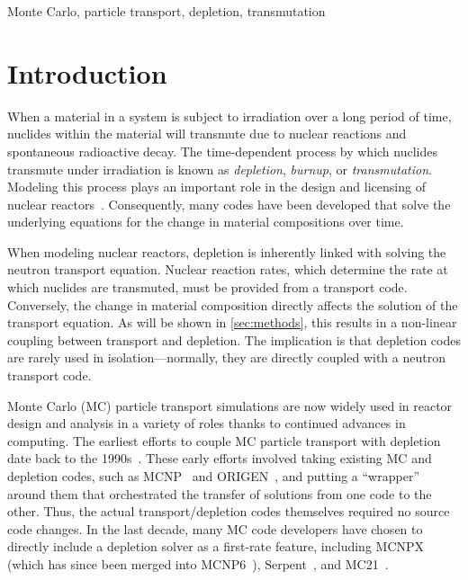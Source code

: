 \documentclass[3p,authoryear]{elsarticle}
\begin{document}
\begin{keyword}
  Monte Carlo, particle transport, depletion, transmutation
\end{keyword}

\maketitle

\section{Introduction}

When a material in a system is subject to irradiation over a long period of
time, nuclides within the material will transmute due to nuclear reactions and
spontaneous radioactive decay. The time-dependent process by which nuclides
transmute under irradiation is known as \emph{depletion}, \emph{burnup}, or
\emph{transmutation}. Modeling this process plays an important role in the
design and licensing of nuclear reactors~\citep{betzler2019ned}. Consequently,
many codes have been developed that solve the underlying equations for the
change in material compositions over time.

When modeling nuclear reactors, depletion is inherently linked with solving the
neutron transport equation. Nuclear reaction rates, which determine the rate at
which nuclides are transmuted, must be provided from a transport code.
Conversely, the change in material composition directly affects the solution of
the transport equation. As will be shown in \cref{sec:methods}, this results in
a non-linear coupling between transport and depletion. The implication is that
depletion codes are rarely used in isolation---normally, they are directly
coupled with a neutron transport code.

Monte Carlo (MC) particle transport simulations are now widely used in reactor
design and analysis in a variety of roles thanks to continued advances in
computing. The earliest efforts to couple MC particle transport with depletion
date back to the 1990s~\citep{moore1995inel,trellue1998lanl}. These early
efforts involved taking existing MC and depletion codes, such as
MCNP~\citep{goorley2012nt} and ORIGEN~\citep{croff1983nt}, and putting a
``wrapper'' around them that orchestrated the transfer of solutions from one
code to the other. Thus, the actual transport/depletion codes themselves
required no source code changes. In the last decade, many MC code developers
have chosen to directly include a depletion solver as a first-rate feature,
including MCNPX~\citep{waters2007aip} (which has since been merged into
MCNP6~\citep{goorley2012nt}), Serpent~\citep{leppanen2015ane}, and
MC21~\citep{griesheimer2015ane}.
\end{document}
